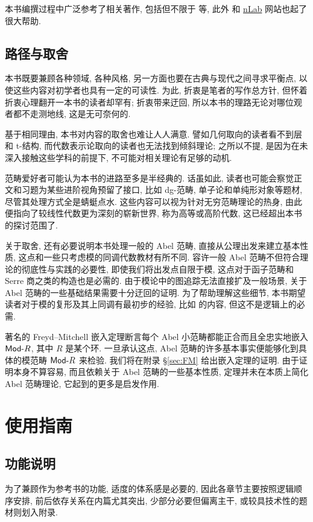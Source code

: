 本书编撰过程中广泛参考了相关著作, 包括但不限于 \cite{Wei94, ML98, KS06, Rie16, Yek20} 等, 此外 \cite{stacks} 和 \href{https://ncatlab.org}{nLab} 网站也起了很大帮助.

\subsection*{路径与取舍}
本书既要兼顾各种领域, 各种风格, 另一方面也要在古典与现代之间寻求平衡点, 以使这些内容对初学者也具有一定的可读性. 为此, 折衷是笔者的写作总方针, 但怀着折衷心理翻开一本书的读者却罕有; 折衷带来迂回, 所以本书的理路无论对哪位观者都不走测地线, 这是无可奈何的.

基于相同理由, 本书对内容的取舍也难让人人满意. 譬如几何取向的读者看不到层和 t-结构, 而代数表示论取向的读者也无法找到倾斜理论; 之所以不提, 是因为在未深入接触这些学科的前提下, 不可能对相关理论有足够的动机.

范畴爱好者可能认为本书的进路至多是半经典的. 话虽如此, 读者也可能会察觉正文和习题为某些进阶视角预留了接口, 比如 dg-范畴, 单子论和单纯形对象等题材, 尽管其处理方式全是蜻蜓点水. 这些内容可以视为针对无穷范畴理论的热身, 由此便指向了较线性代数更为深刻的崭新世界, 称为高等或高阶代数, 这已经超出本书的探讨范围了.

关于取舍, 还有必要说明本书处理一般的 Abel 范畴, 直接从公理出发来建立基本性质, 这点和一些只考虑模的同调代数教材有所不同. 容许一般 Abel 范畴不但符合理论的彻底性与实践的必要性, 即使我们将出发点自限于模, 这点对于函子范畴和 Serre 商之类的构造也是必需的. 由于模论中的图追踪无法直接扩及一般场景, 关于 Abel 范畴的一些基础结果需要十分迂回的证明. 为了帮助理解这些细节, 本书期望读者对于模的复形及其上同调有最初步的经验, 比如 \cite[第六章]{Li1} 的内容, 但这不是逻辑上的必需.

著名的 Freyd--Mitchell 嵌入定理断言每个 Abel 小范畴都能正合而且全忠实地嵌入 $\mathsf{Mod}\text{-}R$, 其中 $R$ 是某个环. 一旦承认这点, Abel 范畴的许多基本事实便能够化到具体的模范畴 $\mathsf{Mod}\text{-}R$ 来检验. 我们将在附录 \S\ref{sec:FM} 给出嵌入定理的证明. 由于证明本身不算容易, 而且依赖关于 Abel 范畴的一些基本性质, 定理并未在本质上简化 Abel 范畴理论, 它起到的更多是启发作用.

\section*{使用指南}
\subsection*{功能说明}
为了兼顾作为参考书的功能, 适度的体系感是必要的, 因此各章节主要按照逻辑顺序安排, 前后依存关系在内篇尤其突出, 少部分必要但偏离主干, 或较具技术性的题材则划入附录.


